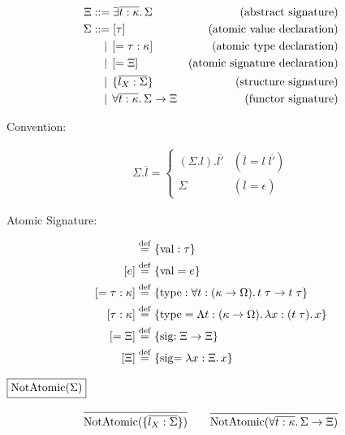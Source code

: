 \begin{align*}
  \Xi
  &\BNFassign \exists \overline{t: \kappa}\ldotp \Sigma &(\text{abstract signature}) \\
  \Sigma
  &\BNFassign [\tau] &(\text{atomic value declaration}) \\
  &\BNFor [= \tau: \kappa] &(\text{atomic type declaration}) \\
  &\BNFor [= \Xi] &(\text{atomic signature declaration}) \\
  &\BNFor \{\overline{l_X: \Sigma}\} &(\text{structure signature}) \\
  &\BNFor \forall \overline{t: \kappa}\ldotp \Sigma \to \Xi &(\text{functor signature})
\end{align*}

Convention:

\begin{align*}
  \Sigma.\overline{l} = \left\{\begin{array}{ll}
    (\Sigma.l).\overline{l'} &(\overline{l} = l\; \overline{l'}) \\
    \Sigma &(\overline{l} = \epsilon)
  \end{array}\right.
\end{align*}

Atomic Signature:

\begin{align*}
  [\tau] &\defrel{=} \{\symval: \tau\} \\
  [e] &\defrel{=} \{\symval = e\} \\
  [= \tau: \kappa] &\defrel{=} \{\symtype: \forall t: (\kappa \to \Omega)\ldotp t\; \tau \to t\; \tau\} \\
  [\tau: \kappa] &\defrel{=} \{\symtype = \Lambda t: (\kappa \to \Omega)\ldotp \lambda x: (t\; \tau)\ldotp x\} \\
  [= \Xi] &\defrel{=} \{\symsig: \Xi \to \Xi\} \\
  [\Xi] &\defrel{=} \{\symsig = \lambda x: \Xi\ldotp x\}
\end{align*}

\newcommand*{\symNotAtomic}{\mathop{\mathrm{NotAtomic}}}

$\fbox{$\symNotAtomic(\Sigma)$}$

\begin{gather*}
  \infer{\symNotAtomic(\{\overline{l_X: \Sigma}\})}{}
  \hspace{2em}
  \infer{\symNotAtomic(\forall \overline{t: \kappa}\ldotp \Sigma \to \Xi)}{}
\end{gather*}

